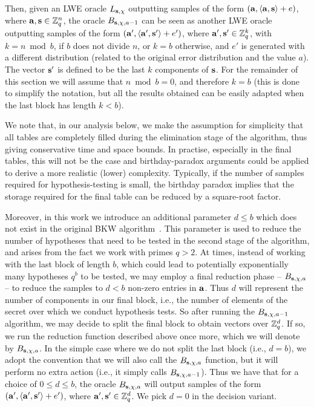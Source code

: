 Then, given an LWE oracle $L_{\mathbf{s},\chi}$ outputting samples of the form $(\mathbf{a},\langle {\ensuremath{\mathbf{a}}},{\mathbf{s}}\rangle + e)$, where $\mathbf{a} , \mathbf{s} \in \mathbb{Z}_q^n$, the oracle
${B_{\mathbf{s},\chi,a-1}}$ can be seen as another LWE oracle outputting samples of the form $(\avec',\dotp{\avec'}{\solvec} + e')$, where $\mathbf{a}' , \mathbf{s'} \in \mathbb{Z}_q^k$, with $k = n \bmod b$, if $b$ does not divide $n$, or $k=b$ otherwise,
and $e'$ is generated with a different distribution (related to the original error distribution and the value $a$).
The vector $\mathbf{s'}$ is defined to be the last $k$ components of $\mathbf{s}$. For the remainder of this section we will assume that $n \bmod b = 0$, and therefore $k=b$ (this is done to simplify the notation, but all the results obtained can be easily adapted when the last block has length $k < b$).

We note that, in our analysis below, we make the assumption for simplicity that all tables are completely filled during the elimination stage of the algorithm, thus giving conservative time and space bounds. In practise, especially in the final tables, this will not be the case and birthday-paradox arguments could be applied to derive a more realistic (lower) complexity. Typically,   if the number of samples required for hypothesis-testing is small, the birthday paradox implies that the storage required for the final table can be reduced by a square-root factor.

Moreover, in this work we introduce an additional parameter $d \leq b$ which does not exist in the original BKW algorithm~\cite{DBLP:journals/jacm/BlumKW03}. This parameter is used to reduce the number of hypotheses that need to be tested in the second stage of the algorithm, and arises from the fact we work with primes $q > 2$. At times, instead of working with the last block of length $b$, which could lead to potentially exponentially many hypotheses $q^b$ to be tested, 
we may employ a final reduction phase -- $B_{\mathbf{s},\chi,a}$ -- to reduce the samples to $d<b$ non-zero entries in $\mathbf{a}$. Thus $d$ will represent the number of components in our final block, i.e., the number of elements of the secret over which we conduct hypothesis tests. So after running the ${B_{\mathbf{s},\chi,a-1}}$ algorithm, we may decide to split the final block to obtain vectors over $\mathbb{Z}_q^d$. If so, we run the reduction function described above once more, which we will denote by $B_{\mathbf{s},\chi,a}$. In the simple case where we do not split the last block (i.e., $d=b$), we adopt the convention that we will also call the $B_{\mathbf{s},\chi,a}$ function, but it will perform no extra action (i.e., it simply calls ${B_{\mathbf{s},\chi,a-1}}$). Thus we have that for a choice of $0 \leq d \leq b$, the oracle ${B_{\mathbf{s},\chi,a}}$ will output samples of the form $(\avec',\dotp{\avec'}{\solvec} + e')$, where $\mathbf{a}' , \mathbf{s'} \in \mathbb{Z}_q^d$. We pick $d=0$ in the decision variant.

